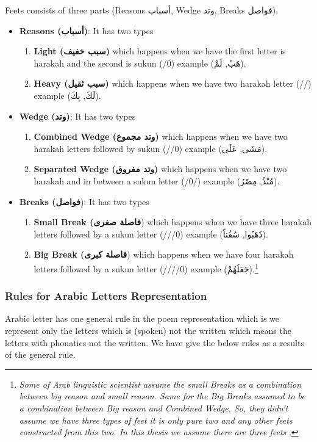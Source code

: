 Feets consists of three parts (Reasons \textarabic{أسباب}, Wedge \textarabic{وتد}, Breaks \textarabic{فواصل}).
\begin{itemize}
\item \textbf{Reasons (\textarabic{أسباب})}: It has two types
  \begin{enumerate}
  \item \textbf{Light (\textarabic{سبب خفيف})} which happens when we have the first letter is harakah and the second is sukun (/0) example (\textarabic{هَبْ, لَمْ}).
    \item \textbf{Heavy (\textarabic{سبب ثقيل})} which happens when we have two harakah letter (//) example (\textarabic{لَكَ, بِكَ}).
    \end{enumerate}
    \item \textbf{Wedge (\textarabic{وتد})}: It has two types
  \begin{enumerate}
  \item \textbf{Combined Wedge (\textarabic{وتد مجموع})} which happens when we have two harakah letters followed by sukun (//0) example (\textarabic{مَشَى, عَلَى}).
    \item \textbf{Separated Wedge (\textarabic{وتد مفروق})} which happens when we have two harakah and in between a sukun letter (/0/) example (\textarabic{مُنْذُ, مِصْرُ}).
    \end{enumerate}
    \item \textbf{Breaks (\textarabic{فواصل}}): It has two types
  \begin{enumerate}
  \item \textbf{Small Break (\textarabic{فاصلة صغرى}}) which happens when we have three harakah letters followed by a sukun letter (///0) example (\textarabic{ذَهَبُوا, سُفُناً}).
    \item \textbf{Big Break (\textarabic{فاصلة كبرى}}) which happens when we have four harakah letters followed by a sukun letter  (////0) example (\textarabic{جَعَلَهُمْ}).\footnote{\textit{Some of Arab linguistic scientist assume the small Breaks as a combination between big reason and small reason. Same for the Big Breaks assumed to be a combination between Big reason and Combined Wedge. So, they didn't assume we have three types of feet it is only pure two and any other feets constructed from this two. In this thesis we assume there are three feets }.}
    \end{enumerate}
  \end{itemize}
  
\newpage
  \subsubsection{Rules for Arabic Letters Representation}
  Arabic letter has one general rule in the poem representation which is we represent only the letters which is (spoken) not the written which means the letters with phonatics not the written. We have give the below rules as a results of the general rule.

